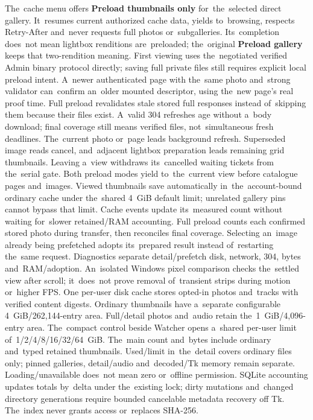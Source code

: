 \documentclass[11pt,a4paper]{article}
\begin{document}
The~cache menu offers \textbf{Preload thumbnails only} for~the~selected
direct gallery. It~resumes current authorized cache data, yields to~browsing,
respects Retry-After and~never requests full photos or~subgalleries.
Its~completion does~not mean lightbox renditions are~preloaded; the~original
\textbf{Preload gallery} keeps that two-rendition meaning.
First viewing uses the~negotiated verified Admin binary protocol directly;
saving full private files still requires explicit local preload intent.
A~newer authenticated page with the~same photo and~strong validator can~confirm
an~older mounted descriptor, using the~new page's real proof time.
Full preload revalidates stale stored full responses instead of~skipping them
because their files exist. A~valid 304 refreshes age without a~body download;
final coverage still means verified files, not~simultaneous fresh deadlines.
The~current photo or~page leads background refresh. Superseded image reads
cancel, and~adjacent lightbox preparation leads remaining grid thumbnails.
Leaving a~view withdraws its~cancelled waiting tickets from the~serial gate.
Both preload modes yield to~the~current view before catalogue pages and~images.
Viewed thumbnails save automatically in~the~account-bound ordinary cache under
the~shared 4~GiB default limit; unrelated gallery pins cannot bypass that limit.
Cache events update its~measured count without waiting for~slower retained/RAM
accounting. Full preload counts each confirmed stored photo during transfer,
then reconciles final coverage. Selecting an~image already being prefetched
adopts its~prepared result instead of~restarting the~same request.
Diagnostics separate detail/prefetch disk, network, 304, bytes and~RAM/adoption.
An~isolated Windows pixel comparison checks the~settled view after scroll;
it~does~not prove removal of~transient strips during motion or~higher FPS.
One per-user disk cache stores opted-in photos and~tracks with verified
content digests. Ordinary thumbnails have a~separate configurable
4~GiB/262,144-entry
area. Full/detail photos and~audio retain the~1~GiB/4,096-entry area.
The~compact control beside Watcher opens a~shared per-user limit
of~1/2/4/8/16/32/64~GiB. The~main count and~bytes include ordinary and~typed
retained thumbnails. Used/limit in~the~detail covers ordinary files only;
pinned galleries, detail/audio and~decoded/Tk memory
remain separate. Loading/unavailable does~not mean zero or~offline permission.
SQLite accounting updates totals by~delta under the~existing lock; dirty
mutations and~changed directory generations require bounded cancelable
metadata recovery off Tk. The~index never grants access or~replaces SHA-256.
\end{document}

